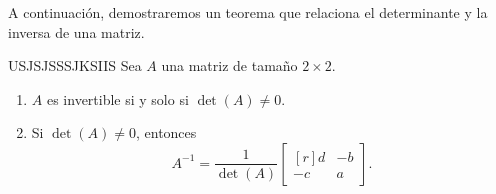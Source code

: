A continuación, demostraremos un teorema que relaciona el determinante y la inversa de una matriz.

\newpage

\begin{theorem}{}{USJSJSSSJKSIIS}
    Sea $A$ una matriz de tamaño $2 \times 2$.
    \begin{enumerate}[label=\roman*), topsep=6pt, itemsep=0pt]
        \item $A$ es invertible si y solo si $\det(A) \neq 0$.
        \item Si $\det(A) \neq 0$, entonces
        \begin{equation}
            A^{-1} = \frac{1}{\det(A)} \begin{bmatrix*}[r]
                d & -b \\
                -c & a
            \end{bmatrix*}. \label{determinante-inversa}
        \end{equation}
    \end{enumerate}


\end{theorem}
